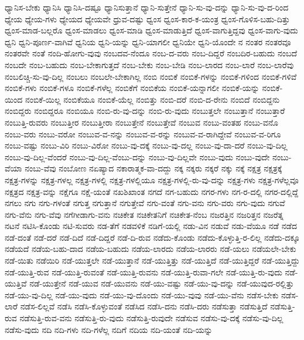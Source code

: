 {ಧ್ಯಾನಿಸ-ಬೇಕು
ಧ್ಯಾನಿಸಿ
ಧ್ಯಾನಿಸಿ-ದಷ್ಟೂ
ಧ್ಯಾನಿಸುತ್ತಾನೆ
ಧ್ಯಾನಿ-ಸುತ್ತೇನೆ
ಧ್ಯಾನಿ-ಸು-ವು-ದನ್ನು
ಧ್ಯಾನಿ-ಸು-ವು-ದ-ರಿಂದ
ಧ್ಯೇಯ
ಧ್ಯೇಯ-ಗಳು
ಧ್ಯೇಯದ
ಧ್ಯೇಯವೇ
ಧ್ರುವ-ದಷ್ಟು
ಧ್ವಂಸ
ಧ್ವಂಸ-ಕಾರ-ಕ-ಯಂತ್ರ
ಧ್ವಂಸ-ಗೊಳಿಸ-ಬಹು-ದಿತ್ತು
ಧ್ವಂಸ-ಮಾಡ-ಬಲ್ಲರೊ
ಧ್ವಂಸ-ಮಾಡಲು
ಧ್ವಂಸ-ಮಾಡಿ
ಧ್ವಂಸ-ಮಾಡುತ್ತಿದೆ
ಧ್ವಂಸ-ವಾಗುತ್ತಿದ್ದವು
ಧ್ವಂಸ-ವಾಗು-ವುದು
ಧ್ವನಿ
ಧ್ವನಿ-ಪೂರ್ಣ-ವಾಗಿವೆ
ಧ್ವನಿಯ
ಧ್ವನಿ-ಯನ್ನು
ಧ್ವನಿ-ಯಾಗಲೀ
ಧ್ವನಿಯೇ
ಧ್ವನಿ-ಯೊಂದೇ
ನ
ನಂತರ
ನಂತರವೂ
ನಂತರವೇ
ನಂತೆ
ನಂದಿ-ಹೋಗು-ವುವು
ನಂಬದವ-ನೆಂದೂ
ನಂಬ-ದ-ವರು
ನಂಬ-ದಿದ್ದರೆ
ನಂಬದಿರ-ಬಹುದು
ನಂಬದೆ
ನಂಬದೇ
ನಂಬ-ಬಹುದು
ನಂಬ-ಬೇಕಾಗುತ್ತದೆ
ನಂಬ-ಬೇಕು
ನಂಬ-ಬೇಡಿ
ನಂಬ-ಲಾರದ
ನಂಬ-ಲಾರೆ
ನಂಬ-ಲಾರೆವು
ನಂಬಲಿಚ್ಚಿ-ಸು-ವು-ದಿಲ್ಲ
ನಂಬಲು
ನಂಬಲೇ-ಬೇಕಾಗಿಲ್ಲ
ನಂಬಿ
ನಂಬಿಕೆ
ನಂಬಿಕೆ-ಗಳನ್ನು
ನಂಬಿಕೆ-ಗಳಿಂದ
ನಂಬಿಕೆ-ಗಳಿವೆ
ನಂಬಿಕೆ-ಗಳು
ನಂಬಿಕೆ-ಗಳೂ
ನಂಬಿಕೆ-ಗಳೆಲ್ಲ
ನಂಬಿಕೆಗೆ
ನಂಬಿಕೆಯ
ನಂಬಿಕೆ-ಯನ್ನಾಗಲೀ
ನಂಬಿಕೆ-ಯನ್ನು
ನಂಬಿಕೆ-ಯಿಂದ
ನಂಬಿಕೆ-ಯಿಲ್ಲ
ನಂಬಿಕೆಯೂ
ನಂಬಿಕೆ-ಯೆಲ್ಲ
ನಂಬಿತ್ತು
ನಂಬಿ-ದರೆ
ನಂಬಿ-ದ-ರೇನು
ನಂಬಿದೆ
ನಂಬಿದ್ದನು
ನಂಬಿದ್ದರು
ನಂಬಿದ್ದರೂ
ನಂಬಿಯೂ
ನಂಬಿ-ರು-ವು-ದನ್ನು
ನಂಬಿ-ರು-ವುದು
ನಂಬುತ್ತಲೇ
ನಂಬುತ್ತಾನೆ
ನಂಬುತ್ತಾರೆ
ನಂಬುತ್ತಿ-ರುವರು
ನಂಬುತ್ತೀರ
ನಂಬುತ್ತೀರಾ
ನಂಬುತ್ತೇನೆ
ನಂಬುತ್ತೇವೆ
ನಂಬುವ
ನಂಬು-ವಂತಹ
ನಂಬು-ವನೊ
ನಂಬು-ವರು
ನಂಬು-ವರೋ
ನಂಬುವ-ವ-ನನ್ನು
ನಂಬುವ-ವ-ರನ್ನು
ನಂಬುವ-ವ-ರಾಗಿದ್ದೇವೆ
ನಂಬುವ-ವ-ರಿಗೂ
ನಂಬು-ವಷ್ಟು
ನಂಬು-ವಿರಿ
ನಂಬು-ವಿರೋ
ನಂಬು-ವು-ದಕ್ಕೆ
ನಂಬು-ವು-ದಲ್ಲ
ನಂಬು-ವು-ದಾ-ದರೆ
ನಂಬು-ವು-ದಿಲ್ಲ
ನಂಬು-ವು-ದಿಲ್ಲ-ವೆಂದರೆ
ನಂಬು-ವು-ದಿಲ್ಲ-ವೆಂಬು-ದನ್ನು
ನಂಬು-ವು-ದಿಲ್ಲವೇ
ನಂಬು-ವುದು
ನಂಬು-ವುದೇ
ನಂಬು-ವೆಯಾ
ನಂಬು-ವೆವು
ನಂಬೋಣ
ನಏಷ್ಯಾದ
ನಕಾರಾತ್ಮಕ-ವಾ-ದದ್ದು
ನಕ್ಕ
ನಕ್ಕರು
ನಕ್ಕರೆ
ನಕ್ಕು
ನಕ್ಕೆ
ನಕ್ಷತ್ರ
ನಕ್ಷತ್ರಕ್ಕೆ
ನಕ್ಷತ್ರ-ಗಳನ್ನು
ನಕ್ಷತ್ರ-ಗಳಲ್ಲ
ನಕ್ಷತ್ರ-ಗಳಲ್ಲಿ
ನಕ್ಷತ್ರ-ಗಳಲ್ಲಿಯೂ
ನಕ್ಷತ್ರ-ಗಳಲ್ಲಿ-ರು-ವು-ದನ್ನು
ನಕ್ಷತ್ರ-ಗಳು
ನಕ್ಷತ್ರ-ಗಳೆಲ್ಲವೂ
ನಕ್ಷತ್ರದ
ನಕ್ಷತ್ರ-ವನ್ನು
ನಕ್ಷೆಗೂ
ನಕ್ಷೆ-ಯಂತೆ
ನಖಶಿಖಾಂತ
ನಗದೆ
ನಗ-ಬಹುದು
ನಗರ-ಗಳು
ನಗ-ರ-ದಲ್ಲಿ
ನಗರ-ದಲ್ಲಿದ್ದೆ
ನಗಲು
ನಗು
ನಗು-ಗಳಂತೆ
ನಗುತ್ತ
ನಗುತ್ತಾನೆ
ನಗುತ್ತೇವೆ
ನಗು-ವಂತೆ
ನಗು-ವನು
ನಗು-ವರು
ನಗು-ವುದು
ನಗುವೆ
ನಗು-ವೆನು
ನಗು-ವೆವು
ನಗೆಗೀಡಾಗು-ವನು
ನಚಿಕೇತ
ನಚಿಕೇತನಿಗೆ
ನಚಿಕೇತ-ನೆಂಬ
ನಜರತ್ತಿನ
ನಜರಿತ್ತನ
ನಜರೆತ್ನ
ನಟನೆ
ನಟಿಸಿ-ಕೊಂಡು
ನಟಿ-ಸುವರು
ನಡ-ತೆಗೆ
ನಡವಳಿಕೆ
ನಡಿಗೆ-ಯಲ್ಲಿ
ನಡು-ವಿನ
ನಡುವೆ
ನಡು-ವೆಯೂ
ನಡೆ
ನಡೆದ
ನಡೆ-ದಂತೆ
ನಡೆ-ದರೆ
ನಡೆ-ದಿದೆ
ನಡೆ-ದಿದ್ದರೆ
ನಡೆ-ದಿ-ರುವ
ನಡೆದು-ಕೊಂಡು
ನಡೆದು-ಕೊಳ್ಳುತ್ತಿ-ರ-ಲಿಲ್ಲ
ನಡೆದು-ದಕ್ಕೂ
ನಡೆಯದೆ
ನಡೆಯ-ಬಹು-ದಾದ
ನಡೆಯ-ಬಹುದು
ನಡೆಯ-ಲಾರದು
ನಡೆಯ-ಲಾರರು
ನಡೆ-ಯಲು
ನಡೆಯಲೇ-ಬೇಕು
ನಡೆ-ಯಿತು
ನಡೆಯಿರಿ
ನಡೆ-ಯುತ್ತಲೇ
ನಡೆ-ಯುತ್ತಾನೆ
ನಡೆ-ಯುತ್ತಿತ್ತು
ನಡೆ-ಯುತ್ತಿದೆ
ನಡೆ-ಯುತ್ತಿದ್ದರೆ
ನಡೆ-ಯುತ್ತಿದ್ದು
ನಡೆ-ಯುತ್ತಿ-ರುವ
ನಡೆ-ಯುತ್ತಿ-ರುವಂತೆ
ನಡೆ-ಯುತ್ತಿ-ರುವನು
ನಡೆ-ಯುತ್ತಿ-ರುವಾ-ಗಲೇ
ನಡೆ-ಯುತ್ತಿ-ರು-ವುದು
ನಡೆ-ಯುತ್ತಿವೆ
ನಡೆ-ಯುತ್ತೇನೆ
ನಡೆ-ಯುವ
ನಡೆ-ಯುವನು
ನಡೆ-ಯು-ವಷ್ಟು
ನಡೆ-ಯು-ವು-ದನ್ನು
ನಡೆ-ಯುವುದ-ರಲ್ಲಿತ್ತು
ನಡೆ-ಯು-ವು-ದಿಲ್ಲ
ನಡೆ-ಯು-ವುದು
ನಡೆ-ಯು-ವು-ದೊಂದು
ನಡೆ-ಯು-ವುವು
ನಡೆ-ಯು-ವೆನು
ನಡೆಸ-ಬೇಕು
ನಡೆಸ-ಲಾರೆ
ನಡೆಸ-ಲಿಲ್ಲವೆ
ನಡೆಸಿ
ನಡೆಸಿ-ಕೊಳ್ಳುವಂತೆ
ನಡೆಸಿದ
ನಡೆಸಿ-ದನು
ನಡೆಸಿ-ದರು
ನಡೆಸುತ್ತಾ
ನಡೆಸುತ್ತಿದೆ
ನಡೆಸುತ್ತಿ-ರುವ
ನಡೆಸುತ್ತಿ-ರುವ-ವನು
ನಡೆಸುತ್ತಿ-ರು-ವುದು
ನಡೆಸುತ್ತಿ-ರುವುದೇ
ನಡೆಸುವ
ನಡೆಸು-ವು-ದಕ್ಕೆ
ನಡೆಸು-ವು-ದಿಲ್ಲ
ನಡೆಸು-ವುದು
ನದಿ
ನದಿ-ಗಳು
ನದಿ-ಗಳೆಲ್ಲ
ನದಿಗೆ
ನದಿಯ
ನದಿ-ಯಂತೆ
ನದಿ-ಯನ್ನು
}
